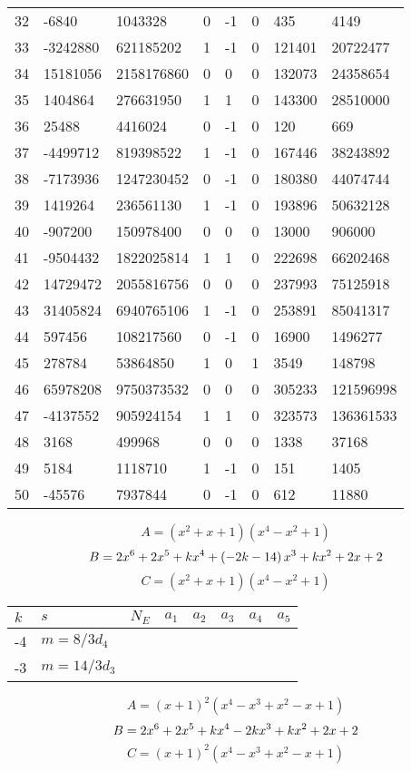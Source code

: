 \documentclass{amsart}
\begin{document}
\begin{longtable}{|l|l|l|lllll|}
32&-6840&1043328&0&-1&0&435&4149\\
33&-3242880&621185202&1&-1&0&121401&20722477\\
34&15181056&2158176860&0&0&0&132073&24358654\\
35&1404864&276631950&1&1&0&143300&28510000\\
36&25488&4416024&0&-1&0&120&669\\
37&-4499712&819398522&1&-1&0&167446&38243892\\
38&-7173936&1247230452&0&-1&0&180380&44074744\\
39&1419264&236561130&1&-1&0&193896&50632128\\
40&-907200&150978400&0&0&0&13000&906000\\
41&-9504432&1822025814&1&1&0&222698&66202468\\
42&14729472&2055816756&0&0&0&237993&75125918\\
43&31405824&6940765106&1&-1&0&253891&85041317\\
44&597456&108217560&0&-1&0&16900&1496277\\
45&278784&53864850&1&0&1&3549&148798\\
46&65978208&9750373532&0&0&0&305233&121596998\\
47&-4137552&905924154&1&1&0&323573&136361533\\
48&3168&499968&0&0&0&1338&37168\\
49&5184&1118710&1&-1&0&151&1405\\
50&-45576&7937844&0&-1&0&612&11880\\
\hline
\end{longtable}
$$A=(x^2
 + x
 + 1)(x^4
 - x^2
 + 1)$$
$$B=2\*x^6
 + 2\*x^5
 + k\*x^4
 + \left(-2\*k
 - 14\right) \*x^3
 + k\*x^2
 + 2\*x
 + 2$$
$$C=(x^2
 + x
 + 1)(x^4
 - x^2
 + 1)$$
\begin{longtable}{|l|l|l|lllll|}
\hline
$k$ & $s$ & $N_E$ & $a_1$ & $a_2$ & $a_3$ & $a_4$ & $a_5$\\
\hline
-4&$m=8/3d_{4}$&&\multicolumn{5}{c|}{}\\
-3&$m=14/3d_{3}$&&\multicolumn{5}{c|}{}\\
\hline
\end{longtable}
$$A=(x
 + 1)^{2}(x^4
 - x^3
 + x^2
 - x
 + 1)$$
$$B=2\*x^6
 + 2\*x^5
 + k\*x^4
 - 2\*k\*x^3
 + k\*x^2
 + 2\*x
 + 2$$
$$C=(x
 + 1)^{2}(x^4
 - x^3
 + x^2
 - x
 + 1)$$
\end{document}
